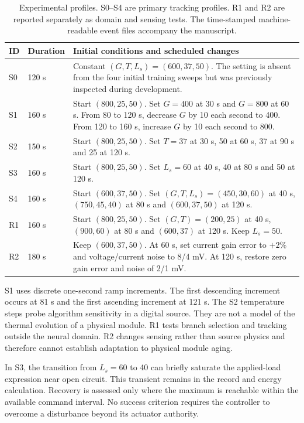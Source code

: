 \documentclass[Acad.Energy.,researcharticle,9pt,twoside,oneauthor]{Definitions/jams_academia}
\begin{document}
\begin{table}[htbp]
\caption{Experimental profiles. S0--S4 are primary tracking profiles. R1 and R2 are reported separately as domain and sensing tests. The time-stamped machine-readable event files accompany the manuscript.}
\label{tab:profiles}
\centering\small
\begin{tabularx}{\textwidth}{p{}p{}L}\toprule
ID & Duration & Initial conditions and scheduled changes\\\midrule
S0 & 120 s & Constant $(G,T,L_s)=(600,37,50)$. The setting is absent from the four initial training sweeps but was previously inspected during development.\\
S1 & 160 s & Start $(800,25,50)$. Set $G=400$ at 30 s and $G=800$ at 60 s. From 80 to 120 s, decrease $G$ by 10 each second to 400. From 120 to 160 s, increase $G$ by 10 each second to 800.\\
S2 & 150 s & Start $(800,25,50)$. Set $T=37$ at 30 s, 50 at 60 s, 37 at 90 s and 25 at 120 s.\\
S3 & 160 s & Start $(800,25,50)$. Set $L_s=60$ at 40 s, 40 at 80 s and 50 at 120 s.\\
S4 & 160 s & Start $(600,37,50)$. Set $(G,T,L_s)=(450,30,60)$ at 40 s, $(750,45,40)$ at 80 s and $(600,37,50)$ at 120 s.\\
R1 & 160 s & Start $(800,25,50)$. Set $(G,T)=(200,25)$ at 40 s, $(900,60)$ at 80 s and $(600,37)$ at 120 s. Keep $L_s=50$.\\
R2 & 180 s & Keep $(600,37,50)$. At 60 s, set current gain error to $+2$\% and voltage/current noise to 8/4 mV. At 120 s, restore zero gain error and noise of 2/1 mV.\\\bottomrule
\end{tabularx}
\end{table}



S1 uses discrete one-second ramp increments. The first descending increment occurs at 81 s and the first ascending increment at 121 s. The S2 temperature steps probe algorithm sensitivity in a digital source. They are not a model of the thermal evolution of a physical module. R1 tests branch selection and tracking outside the neural domain. R2 changes sensing rather than source physics and therefore cannot establish adaptation to physical module aging.

In S3, the transition from $L_s=60$ to 40 can briefly saturate the applied-load expression near open circuit. This transient remains in the record and energy calculation. Recovery is assessed only where the maximum is reachable within the available command interval. No success criterion requires the controller to overcome a disturbance beyond its actuator authority.
\end{document}
